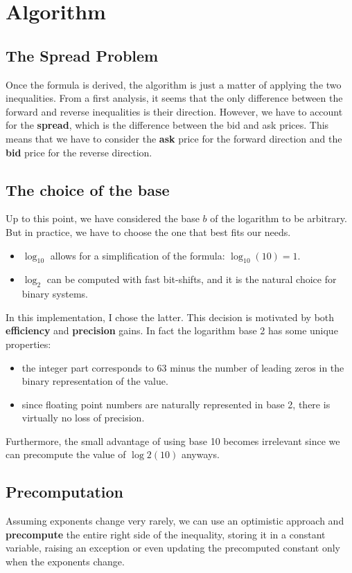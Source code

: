 \documentclass[11pt]{article}
\begin{document}
\section{Algorithm}

\subsection{The Spread Problem}
Once the formula is derived, the algorithm is just a matter of applying the two inequalities. From a first analysis, it seems that the only difference between the forward and reverse inequalities is their direction. However, we have to account for the \textbf{spread}, which is the difference between the bid and ask prices. This means that we have to consider the \textbf{ask} price for the forward direction and the \textbf{bid} price for the reverse direction.

\subsection{The choice of the base}
Up to this point, we have considered the base $b$ of the logarithm to be arbitrary. But in practice, we have to choose the one that best fits our needs.
\begin{itemize}
    \item $\log_{10}$ allows for a simplification of the formula: $\log_{10}(10) = 1$.
    \item $\log_{2}$ can be computed with fast bit-shifts, and it is the natural choice for binary systems\textsuperscript{\cite{bithacks}}.
\end{itemize}
In this implementation, I chose the latter. This decision is motivated by both \textbf{efficiency} and \textbf{precision} gains. In fact the logarithm base 2 has some unique properties:
\begin{itemize}
    \item the integer part corresponds to 63 minus the number of leading zeros in the binary representation of the value.
    \item since floating point numbers are naturally represented in base 2, there is virtually no loss of precision.
\end{itemize}
Furthermore, the small advantage of using base 10 becomes irrelevant since we can precompute the value of $\log2(10)$ anyways.

\subsection{Precomputation}
Assuming exponents change very rarely, we can use an optimistic approach and \textbf{precompute} the entire right side of the inequality, storing it in a constant variable, raising an exception or even updating the precomputed constant only when the exponents change.
\end{document}
